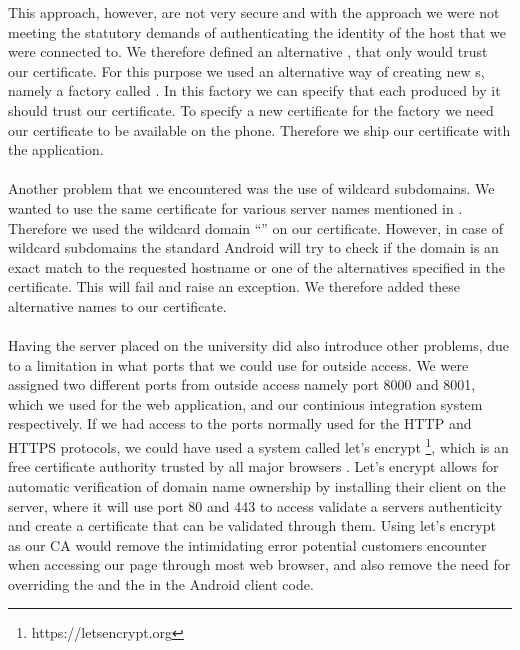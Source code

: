 This approach, however, are not very secure and with the approach we were not meeting the statutory demands of authenticating the identity of the host that we were connected to. We therefore defined an alternative , that only would trust our certificate. For this purpose we used an alternative way of creating new s, namely a factory called . In this factory we can specify that each  produced by it should trust our certificate. To specify a new certificate for the factory we need our certificate to be available on the phone. Therefore we ship our certificate with the application. 
\\\\
Another problem that we encountered was the use of wildcard subdomains. We wanted to use the same certificate for various server names mentioned in . Therefore we used the wildcard domain ``'' on our certificate. However, in case of wildcard subdomains the standard Android  will try to check if the domain is an exact match to the requested hostname or one of the alternatives specified in the certificate. This will fail and raise an exception. We therefore added these alternative names to our certificate.
\\\\
Having the server placed on the university did also introduce other problems, due to a limitation in what ports that we could use for outside access. 
We were assigned two different ports from outside access namely port 8000 and 8001, which we used for the web application, and our continious integration system respectively. 
If we had access to the ports normally used for the HTTP and HTTPS protocols, we could have used a system called let's encrypt \footnote{https://letsencrypt.org}, which is an free certificate authority trusted by all major browsers \parencite{lets_encrypt_all_browsers}. Let's encrypt allows for automatic verification of domain name ownership by installing their client on the server, where it will use port 80 and 443 to access validate a servers authenticity and create a certificate that can be validated through them. Using let's encrypt as our CA would remove the intimidating error potential customers encounter when accessing our page through most web browser, and also remove the need for overriding the  and the  in the Android client code.